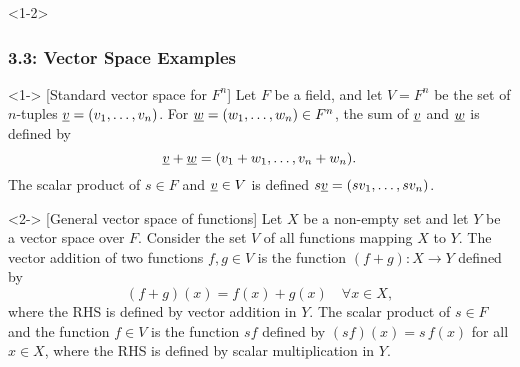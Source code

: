 \documentclass[10pt,english,aspectratio=169]{beamer}
\begin{document}
\begin{frame}<1-2> \frametitle{3.3: Vector Space Examples}

\begin{example}<1-> [Standard vector space for $F^n$]
Let $F$ be a field, and let $V=F^n$ be the set of $n$-tuples $\underline{v} = (v_1, \ldots, v_n)$.
For $\underline{w} = (w_1, \ldots, w_n) \in F^n$, the sum of $\underline{v}$ and $\underline{w}$ is defined by \vspace{-1mm}
\begin{equation*}
\underline{v} + \underline{w} = (v_1 + w_1, \ldots, v_n + w_n).
\end{equation*}
The scalar product of $s \in F$ and $\underline{v} \in V$ is defined $s \underline{v} = (s v_1, \ldots, s v_n)$.
\end{example}

\begin{example}<2-> [General vector space of functions]
Let $X$ be a non-empty set and let $Y$ be a vector space over $F$.
Consider the set $V$ of all functions mapping $X$ to $Y$.
The vector addition of two functions $f,g \in V$ is the function $(f+g)\colon X \to Y$ defined by  \vspace{-1mm}
\begin{equation*}
(f + g)(x) = f(x) + g(x) \quad \forall x \in X,
\end{equation*}
where the RHS is defined by vector addition in $Y$.
The scalar product of $s \in F$ and the function $f \in V$ is the function $sf$ defined by
$(sf)(x) = s \, f(x)$ for all $x \in X$,
where the RHS is defined by scalar multiplication in $Y$.
\vspace{-1mm}
\end{example}


\end{frame}
\end{document}

